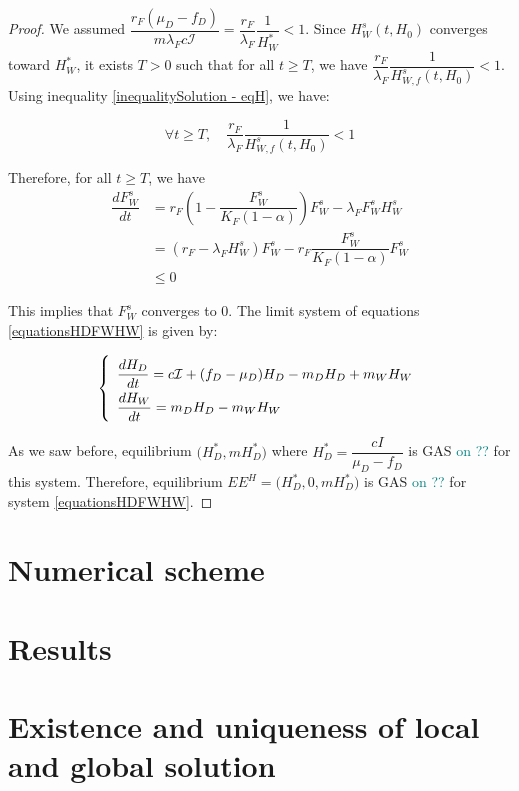 \documentclass{article}
\newcommand{\lfw}{\lambda_{F}}
\newcommand{\lfw}{\lambda_{F}}
\newcommand{\marc}[1]{\textcolor{teal}{#1}}
\begin{document}
\begin{proof}
\medskip

We assumed $\dfrac{r_F(\mu_D-f_D)}{m\lfw c\mathcal{I}} = \dfrac{r_F}{\lfw}\dfrac{1}{H_W^*} < 1$. Since $H_W^s(t, H_0)$ converges toward $H_W^*$, it exists $T > 0$ such that for all $t \geq T$, we have $\dfrac{r_F}{\lfw}\dfrac{1}{H_{W, f}^s(t, H_0)} < 1$. Using inequality \eqref{inequalitySolution - eqH}, we have:

\begin{equation}
\forall t \geq T, \quad \dfrac{r_F}{\lfw}\dfrac{1}{H_{W, f}^s(t, H_0)} < 1
\end{equation}

\medskip
Therefore, for all $t \geq T$, we have
\begin{align*}
\dfrac{dF_W^s}{dt} &= r_F \left(1 - \dfrac{F_W^s}{K_F(1-\alpha)} \right) F_W^s - \lfw F_W^s H_W^s \\
&= \left(r_F- \lfw H_W^s\right) F_W^s - r_F \dfrac{F_W^s}{K_F(1-\alpha)}F_W^s \\
& \leq 0
\end{align*}

This implies that $F_W^s$ converges to 0. The limit system of equations \eqref{equationsHDFWHW} is given by:

\begin{equation}
\def\arraystretch{2}
\left\{ \begin{array}{l}
\dfrac{dH_D}{dt}= c\mathcal{I} + (f_D - \mu_D) H_D - m_D H_D + m_W H_W  \\
\dfrac{dH_W}{dt}= m_D H_D - m_W H_W
\end{array}\right.
\end{equation}

As we saw before, equilibrium $\Big(H_D^*, mH_D^*\Big)$ where $H_D^* = \dfrac{cI}{\mu_D - f_D}$ is GAS \marc{on ??} for this system. Therefore, equilibrium $EE^{H} = \Big(H_D^*, 0, mH_D^*\Big)$ is GAS \marc{on ??} for system \eqref{equationsHDFWHW}.
\end{proof}

\section{Numerical scheme}

\section{Results}

\section{Existence and uniqueness of local and global solution}
\end{document}

